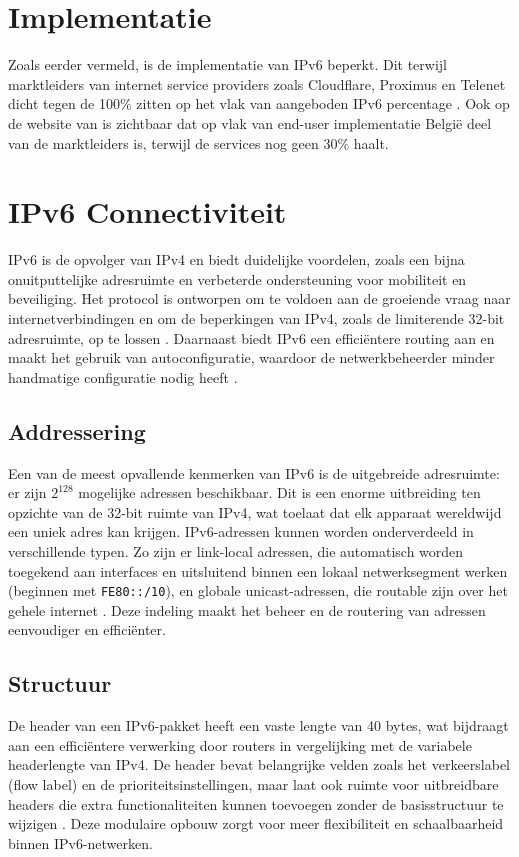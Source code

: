   \section{Implementatie}
  \label{sec:implementatie}
  
  Zoals eerder vermeld, is de implementatie van IPv6 beperkt. 
  Dit terwijl marktleiders van internet service providers zoals Cloudflare, Proximus en Telenet dicht tegen de 100\% zitten op het vlak van aangeboden IPv6 percentage \autocite{Test2024}. 
  Ook op de website van \textcite{EuropeanCommission} is zichtbaar dat op vlak van end-user implementatie België deel van de marktleiders is, terwijl de services nog geen 30\% haalt.
  
  \section{IPv6 Connectiviteit}
  \label{sec:ipv6 connectiviteit}

  IPv6 is de opvolger van IPv4 en biedt duidelijke voordelen, zoals een bijna onuitputtelijke adresruimte en verbeterde ondersteuning voor mobiliteit en beveiliging. 
  Het protocol is ontworpen om te voldoen aan de groeiende vraag naar internetverbindingen en om de beperkingen van IPv4, zoals de limiterende 32-bit adresruimte, op te lossen \textcite{NSA2023}. 
  Daarnaast biedt IPv6 een efficiëntere routing aan en maakt het gebruik van autoconfiguratie, waardoor de netwerkbeheerder minder handmatige configuratie nodig heeft \textcite{Cliff2012}.
  
  \subsection{Addressering}
  Een van de meest opvallende kenmerken van IPv6 is de uitgebreide adresruimte: er zijn $2^{128}$ mogelijke adressen beschikbaar. 
  Dit is een enorme uitbreiding ten opzichte van de 32-bit ruimte van IPv4, wat toelaat dat elk apparaat wereldwijd een uniek adres kan krijgen. 
  IPv6-adressen kunnen worden onderverdeeld in verschillende typen. Zo zijn er link-local adressen, 
  die automatisch worden toegekend aan interfaces en uitsluitend binnen een lokaal netwerksegment werken (beginnen met \texttt{FE80::/10}), en globale unicast-adressen, 
  die routable zijn over het gehele internet \textcite{Zunainah2021}. Deze indeling maakt het beheer en de routering van adressen eenvoudiger en efficiënter.
  
  \subsection{Structuur}
  De header van een IPv6-pakket heeft een vaste lengte van 40 bytes, wat bijdraagt aan een efficiëntere verwerking door routers in vergelijking met de variabele headerlengte van IPv4. 
  De header bevat belangrijke velden zoals het verkeerslabel (flow label) en de prioriteitsinstellingen, 
  maar laat ook ruimte voor uitbreidbare headers die extra functionaliteiten kunnen toevoegen zonder de basisstructuur te wijzigen \textcite{Cliff2012}. 
  Deze modulaire opbouw zorgt voor meer flexibiliteit en schaalbaarheid binnen IPv6-netwerken.
  
